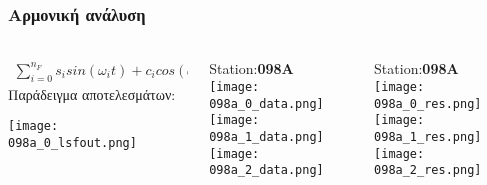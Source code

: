 \begin{frame}
  \frametitle{Αρμονική ανάλυση}
  \framesubtitle{}
  \label{}
  \vskip-1cm
  \begin{columns}[T]
    \begin{column}{.33\textwidth}
      \begin{align*}
        \sum_{i=0}^{n_F} s_{i} sin(\omega_{i}t) + c_{i} cos(\omega_{i}t)
      \end{align*}
      Παράδειγμα αποτελεσμάτων:
       \begin{center}
         \texttt{[image: 098a\_0\_lsfout.png]}
       \end{center}
    \end{column}
    \begin{column}{.33\textwidth}
      \begin{center}
      Station:\textbf{098A}\\
         \texttt{[image: 098a\_0\_data.png]}\\
         \texttt{[image: 098a\_1\_data.png]}\\
         \texttt{[image: 098a\_2\_data.png]}
       \end{center} 
    \end{column}
    \begin{column}{.33\textwidth}
      \begin{center}
      Station:\textbf{098A}\\
         \texttt{[image: 098a\_0\_res.png]}\\
         \texttt{[image: 098a\_1\_res.png]}\\
         \texttt{[image: 098a\_2\_res.png]}
       \end{center} 
    \end{column}
  \end{columns}
\end{frame}
\note{}
%
